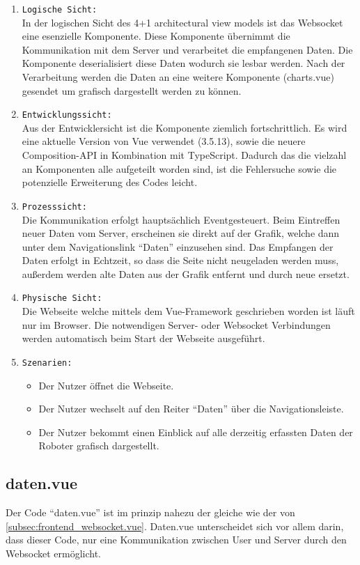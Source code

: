 \begin{enumerate}
  \item \texttt{Logische Sicht:} \\
  In der logischen Sicht des 4+1 architectural view models ist das Websocket eine esenzielle Komponente.
  Diese Komponente übernimmt die Kommunikation mit dem Server und verarbeitet die empfangenen Daten.
  Die Komponente deserialisiert diese Daten wodurch sie lesbar werden. Nach der Verarbeitung werden die Daten an 
  eine weitere Komponente (charts.vue) gesendet um grafisch dargestellt werden zu können.
  \item \texttt{Entwicklungssicht:} \\
  Aus der Entwicklersicht ist die Komponente ziemlich fortschrittlich.
  Es wird eine aktuelle Version von Vue verwendet (3.5.13), sowie die neuere Composition-API in Kombination mit TypeScript.
  Dadurch das die vielzahl an Komponenten alle aufgeteilt worden sind,
  ist die Fehlersuche sowie die potenzielle Erweiterung des Codes leicht.
  \item \texttt{Prozesssicht:} \\
  Die Kommunikation erfolgt hauptsächlich Eventgesteuert. 
  Beim Eintreffen neuer Daten vom Server, erscheinen sie direkt auf der Grafik, 
  welche dann unter dem Navigationslink ``Daten'' einzusehen sind. 
  Das Empfangen der Daten erfolgt in Echtzeit, so dass die Seite nicht neugeladen werden muss, 
  außerdem werden alte Daten aus der Grafik entfernt und durch neue ersetzt.
  \item \texttt{Physische Sicht:} \\
  Die Webseite welche mittels dem Vue-Framework geschrieben worden ist läuft nur im Browser.
  Die notwendigen Server- oder Websocket Verbindungen werden automatisch beim Start der Webseite ausgeführt.
  \item \texttt{Szenarien:} \\
    \begin{itemize}
      \renewcommand{\labelitemi}{$\Rightarrow$}
    \item Der Nutzer öffnet die Webseite.
    \item Der Nutzer wechselt auf den Reiter ``Daten'' über die Navigationsleiste.
    \item Der Nutzer bekommt einen Einblick auf alle derzeitig erfassten Daten der Roboter grafisch dargestellt.
    \end{itemize}
\end{enumerate}

\subsection{daten.vue}
\label{subsec:frontend_daten.vue}
Der Code ``daten.vue'' ist im prinzip nahezu der gleiche wie der von \ref{subsec:frontend_websocket.vue}.
Daten.vue unterscheidet sich vor allem darin, dass dieser Code,
nur eine Kommunikation zwischen User und Server durch den Websocket ermöglicht.
%

